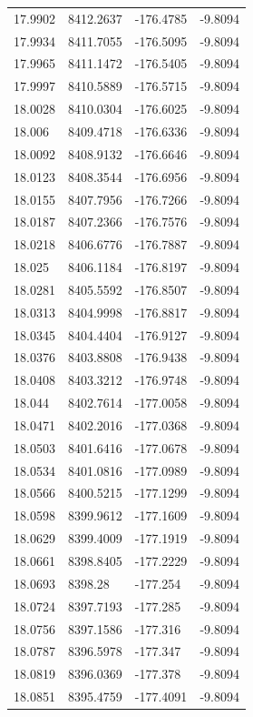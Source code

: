 \begin{table}[H]
\begin{tabular}{llll}
17.9902 & 8412.2637 & -176.4785 & -9.8094 \\
17.9934 & 8411.7055 & -176.5095 & -9.8094 \\
17.9965 & 8411.1472 & -176.5405 & -9.8094 \\
17.9997 & 8410.5889 & -176.5715 & -9.8094 \\
18.0028 & 8410.0304 & -176.6025 & -9.8094 \\
18.006 & 8409.4718 & -176.6336 & -9.8094 \\
18.0092 & 8408.9132 & -176.6646 & -9.8094 \\
18.0123 & 8408.3544 & -176.6956 & -9.8094 \\
18.0155 & 8407.7956 & -176.7266 & -9.8094 \\
18.0187 & 8407.2366 & -176.7576 & -9.8094 \\
18.0218 & 8406.6776 & -176.7887 & -9.8094 \\
18.025 & 8406.1184 & -176.8197 & -9.8094 \\
18.0281 & 8405.5592 & -176.8507 & -9.8094 \\
18.0313 & 8404.9998 & -176.8817 & -9.8094 \\
18.0345 & 8404.4404 & -176.9127 & -9.8094 \\
18.0376 & 8403.8808 & -176.9438 & -9.8094 \\
18.0408 & 8403.3212 & -176.9748 & -9.8094 \\
18.044 & 8402.7614 & -177.0058 & -9.8094 \\
18.0471 & 8402.2016 & -177.0368 & -9.8094 \\
18.0503 & 8401.6416 & -177.0678 & -9.8094 \\
18.0534 & 8401.0816 & -177.0989 & -9.8094 \\
18.0566 & 8400.5215 & -177.1299 & -9.8094 \\
18.0598 & 8399.9612 & -177.1609 & -9.8094 \\
18.0629 & 8399.4009 & -177.1919 & -9.8094 \\
18.0661 & 8398.8405 & -177.2229 & -9.8094 \\
18.0693 & 8398.28 & -177.254 & -9.8094 \\
18.0724 & 8397.7193 & -177.285 & -9.8094 \\
18.0756 & 8397.1586 & -177.316 & -9.8094 \\
18.0787 & 8396.5978 & -177.347 & -9.8094 \\
18.0819 & 8396.0369 & -177.378 & -9.8094 \\
18.0851 & 8395.4759 & -177.4091 & -9.8094 \\

\end{tabular}
\end{table}
